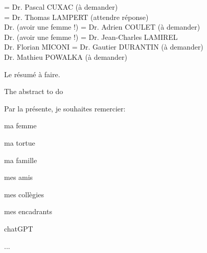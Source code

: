 \documentclass[11pt]{template/thesul}
\begin{document}


\ThesisUL

\President={
    Dr. Pascal CUXAC (à demander)\\
}
\Rapporteurs ={
    Dr. Thomas LAMPERT (attendre réponse)\\
    Dr. (avoir une femme !)
}
\Examinateurs={
    Dr. Adrien COULET (à demander)\\
    Dr. (avoir une femme !)
}
\Encadrants={
    Dr. Jean-Charles LAMIREL\\
    Dr. Florian MICONI
}
\Invites={
    Dr. Gautier DURANTIN (à demander)\\
    Dr. Mathieu POWALKA (à demander)
}

\MakeThesisTitlePage



\NumberAbstractPages
\begin{ThesisAbstract}

    \begin{FrenchAbstract}
        Le résumé à faire.
    \end{FrenchAbstract}

    \begin{EnglishAbstract}
        The abstract to do
    \end{EnglishAbstract}
\end{ThesisAbstract}


\begin{ThesisAcknowledgments}

    Par la présente, je souhaites remercier:
    \begin{todolist}
        \item ma femme
        \item ma tortue
        \item ma famille
        \item mes amis
        \item mes collègies
        \item mes encadrants
        \item chatGPT
        \item ...
    \end{todolist}

\end{ThesisAcknowledgments}
\end{document}
